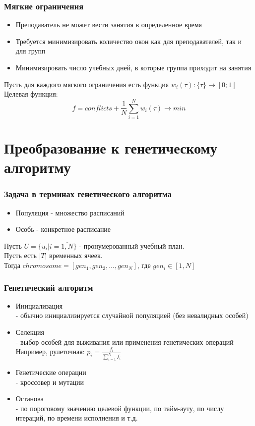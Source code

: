 \documentclass[t, 12pt]{beamer}
\theoremstyle{definition}
\begin{document}
\begin{frame}
\frametitle{Мягкие ограничения}
\begin{itemize}
\item Преподаватель не может вести занятия в определенное время\\
\item Требуется минимизировать количество окон как для преподавателей, так и для групп\\
\item Минимизировать число учебных дней, в которые группа приходит на занятия\\
\end{itemize}
Пусть для каждого мягкого ограничения есть функция $w_i(\tau): \{\tau\} \to [0;1]$\\
Целевая функция:
$$f = conflicts + \frac{1}{N} \sum^N_{i=1} w_i(\tau) \to min$$
\end{frame}

\section{Преобразование к генетическому алгоритму}

\begin{frame}[c]
\frametitle{Задача в терминах генетического алгоритма}
\begin{itemize}
\item Популяция - множество расписаний
\item Особь - конкретное расписание
\end{itemize}
Пусть $U = \{u_i | i = \overline{1, N}\}$ - пронумерованный учебный план.\\
Пусть есть $|T|$ временных ячеек.\\
Тогда $chromosome = [gen_1, gen_2, \dots, gen_N]$, где  $gen_i \in [1, N]$\\
\end{frame}

\begin{frame}
\frametitle{Генетический алгоритм}
\begin{itemize}
\item Инициализация\\
- обычно инициализируется случайной популяцией (без невалидных особей)
\item Селекция\\
- выбор особей для выживания или применения генетических операций\\
Например, рулеточная: $p_i = \frac{f_i}{\sum^N_{i=1}f_i}$
\item Генетические операции\\
- кроссовер и мутации
\item Останова\\
- по пороговому значению целевой функции, по тайм-ауту, по числу итераций, по времени исполнения и т.д.
\end{itemize}
\end{frame}
\end{document}
